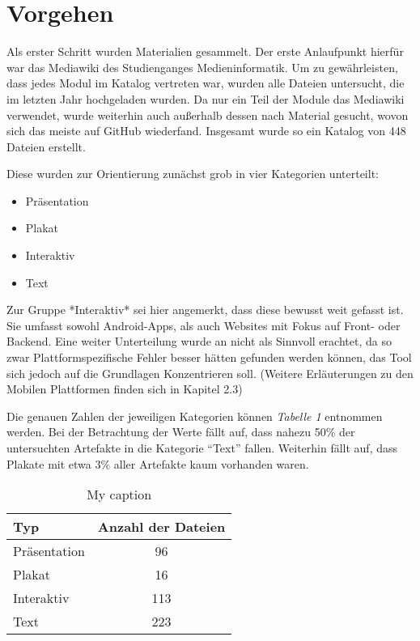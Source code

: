 
\section{Vorgehen}
Als erster Schritt wurden Materialien gesammelt. Der erste Anlaufpunkt hierfür war das Mediawiki des Studienganges Medieninformatik. Um zu gewährleisten, dass jedes Modul im Katalog vertreten war, wurden alle Dateien untersucht, die im letzten Jahr hochgeladen wurden.
Da nur ein Teil der Module das Mediawiki verwendet, wurde weiterhin auch außerhalb dessen nach Material gesucht, wovon sich das meiste auf GitHub wiederfand.
Insgesamt wurde so ein Katalog von 448 Dateien erstellt.

Diese wurden zur Orientierung zunächst grob in vier Kategorien unterteilt:

\begin{itemize}
  \item Präsentation
  \item Plakat
  \item Interaktiv
  \item Text
\end{itemize}

Zur Gruppe *Interaktiv* sei hier angemerkt, dass diese bewusst weit gefasst ist. Sie umfasst sowohl Android-Apps, als auch Websites mit Fokus auf Front- oder Backend.
Eine weiter Unterteilung wurde an nicht als Sinnvoll erachtet, da so zwar Plattformspezifische Fehler besser hätten gefunden werden können, das Tool sich jedoch auf die Grundlagen Konzentrieren soll. (Weitere Erläuterungen zu den Mobilen Plattformen finden sich in Kapitel 2.3)

Die genauen Zahlen der jeweiligen Kategorien können \textit{Tabelle 1} entnommen werden. Bei der Betrachtung der Werte fällt auf, dass nahezu 50\% der untersuchten Artefakte in die Kategorie “Text” fallen. Weiterhin fällt auf, dass Plakate mit etwa 3\% aller Artefakte kaum vorhanden waren.

\begin{table}[]
\centering
\begin{tabular}{|l|c|}
\hline
\textbf{Typ} & \multicolumn{1}{l|}{\textbf{Anzahl der Dateien}} \\ \hline
Präsentation & 96                                               \\ \hline
Plakat       & 16                                               \\ \hline
Interaktiv   & 113                                              \\ \hline
Text         & 223                                              \\ \hline
\end{tabular}
\caption{My caption}
\label{Tabelle 1}
\end{table}

